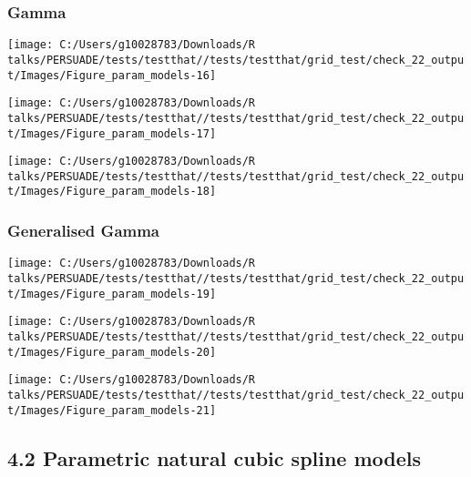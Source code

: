 \documentclass[
]{article}
\begin{document}
\subsubsection{Gamma}\label{gamma}

\begin{flushleft}\texttt{[image: C:/Users/g10028783/Downloads/R talks/PERSUADE/tests/testthat//tests/testthat/grid\_test/check\_22\_output/Images/Figure\_param\_models-16]} \end{flushleft}

\begin{flushleft}\texttt{[image: C:/Users/g10028783/Downloads/R talks/PERSUADE/tests/testthat//tests/testthat/grid\_test/check\_22\_output/Images/Figure\_param\_models-17]} \end{flushleft}

\begin{flushleft}\texttt{[image: C:/Users/g10028783/Downloads/R talks/PERSUADE/tests/testthat//tests/testthat/grid\_test/check\_22\_output/Images/Figure\_param\_models-18]} \end{flushleft}

\clearpage

\subsubsection{Generalised Gamma}\label{generalised-gamma}

\begin{flushleft}\texttt{[image: C:/Users/g10028783/Downloads/R talks/PERSUADE/tests/testthat//tests/testthat/grid\_test/check\_22\_output/Images/Figure\_param\_models-19]} \end{flushleft}

\begin{flushleft}\texttt{[image: C:/Users/g10028783/Downloads/R talks/PERSUADE/tests/testthat//tests/testthat/grid\_test/check\_22\_output/Images/Figure\_param\_models-20]} \end{flushleft}

\begin{flushleft}\texttt{[image: C:/Users/g10028783/Downloads/R talks/PERSUADE/tests/testthat//tests/testthat/grid\_test/check\_22\_output/Images/Figure\_param\_models-21]} \end{flushleft}

\clearpage

\subsection{4.2 Parametric natural cubic spline
models}\label{parametric-natural-cubic-spline-models}
\end{document}
